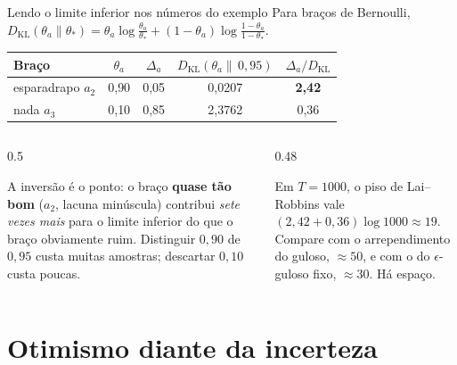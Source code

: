 \documentclass[aspectratio=169, 10pt]{beamer}
\newcommand{\gap}{\Delta}
\newcommand{\KL}{D_{\mathrm{KL}}}
\begin{document}
\begin{frame}{Lendo o limite inferior nos números do exemplo}
  Para braços de Bernoulli,
  $\KL(\theta_a \| \theta_{*}) = \theta_a \log \frac{\theta_a}{\theta_{*}}
   + (1-\theta_a)\log\frac{1-\theta_a}{1-\theta_{*}}$.

  \vspace{0.4em}
  \centering
  \begin{tabular}{lcccc}
    \toprule
    \textbf{Braço} & $\theta_a$ & $\gap_a$
      & $\KL(\theta_a\|\,0{,}95)$ & $\gap_a / \KL$ \\
    \midrule
    esparadrapo $a_2$ & 0{,}90 & 0{,}05 & 0{,}0207 & \textbf{2{,}42} \\
    nada $a_3$        & 0{,}10 & 0{,}85 & 2{,}3762 & 0{,}36 \\
    \bottomrule
  \end{tabular}

  \vspace{0.8em}
  \begin{columns}[T]
    \begin{column}{0.5\textwidth}
      \begin{alertabox}
        A inversão é o ponto: o braço \textbf{quase tão bom} ($a_2$, lacuna
        minúscula) contribui \emph{sete vezes mais} para o limite inferior
        do que o braço obviamente ruim. Distinguir $0{,}90$ de $0{,}95$
        custa muitas amostras; descartar $0{,}10$ custa poucas.
      \end{alertabox}
    \end{column}
    \begin{column}{0.48\textwidth}
      \begin{ideiabox}
        Em $T = 1000$, o piso de Lai--Robbins vale
        $(2{,}42 + 0{,}36)\log 1000 \approx 19$. Compare com o
        arrependimento do guloso, $\approx 50$, e com o do
        $\epsilon$-guloso fixo, $\approx 30$. Há espaço.
      \end{ideiabox}
    \end{column}
  \end{columns}
\end{frame}

\section{Otimismo diante da incerteza}
\end{document}
